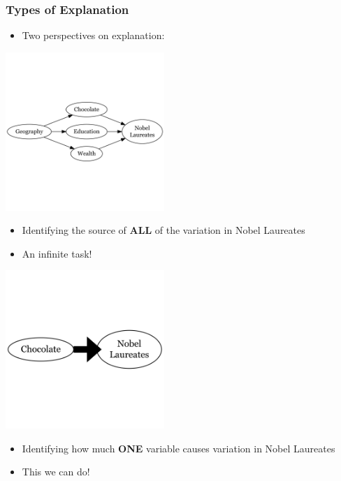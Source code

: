 \documentclass[xcolor=x11names,compress]{beamer}\usepackage[]{graphicx}\usepackage[]{xcolor}
\renewcommand{\(}{\begin{columns}}
\renewcommand{\)}{\end{columns}}
\newcommand{\<}[1]{\begin{column}{#1}}
\renewcommand{\>}{\end{column}}
\begin{document}
\begin{frame}
\frametitle{Types of Explanation}
\begin{itemize}
\item Two perspectives on explanation:
\end{itemize}
\begin{multicols}{2}

\includegraphics[width=0.45\textwidth]{graph6.png}
\begin{itemize}
\item Identifying the source of \textbf{ALL} of the variation in Nobel Laureates
\item An infinite task!
\end{itemize}
\columnbreak

\includegraphics[width=0.45\textwidth]{graph7.png}
\begin{itemize}
\item Identifying how much \textbf{ONE} variable causes variation in Nobel Laureates
\item This we can do!
\end{itemize}
\end{multicols}
\end{frame}
\end{document}
